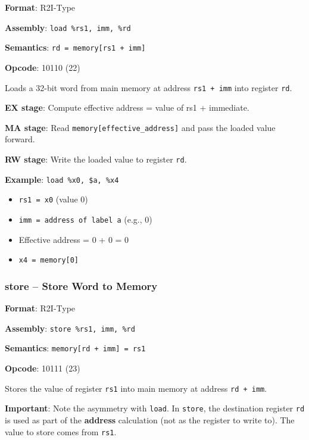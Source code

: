 \documentclass[12pt,a4paper]{article}
\begin{document}
\begin{tcolorbox}[colback=yellow!5, colframe=yellow!50!black]
\textbf{Format}: R2I-Type

\textbf{Assembly}: \texttt{load \%rs1, imm, \%rd}

\textbf{Semantics}: \texttt{rd = memory[rs1 + imm]}

\textbf{Opcode}: 10110 (22)
\end{tcolorbox}

Loads a 32-bit word from main memory at address \texttt{rs1 + imm} into register \texttt{rd}.

\textbf{EX stage}: Compute effective address = value of rs1 + immediate.

\textbf{MA stage}: Read \texttt{memory[effective\_address]} and pass the loaded value forward.

\textbf{RW stage}: Write the loaded value to register \texttt{rd}.

\textbf{Example}: \texttt{load \%x0, \$a, \%x4}
\begin{itemize}
    \item \texttt{rs1 = x0} (value 0)
    \item \texttt{imm = address of label a} (e.g., 0)
    \item Effective address = 0 + 0 = 0
    \item \texttt{x4 = memory[0]}
\end{itemize}

\subsubsection{store -- Store Word to Memory}

\begin{tcolorbox}[colback=yellow!5, colframe=yellow!50!black]
\textbf{Format}: R2I-Type

\textbf{Assembly}: \texttt{store \%rs1, imm, \%rd}

\textbf{Semantics}: \texttt{memory[rd + imm] = rs1}

\textbf{Opcode}: 10111 (23)
\end{tcolorbox}

Stores the value of register \texttt{rs1} into main memory at address \texttt{rd + imm}.

\textbf{Important}: Note the asymmetry with \texttt{load}. In \texttt{store}, the destination register \texttt{rd} is used as part of the \textbf{address} calculation (not as the register to write to). The value to store comes from \texttt{rs1}.
\end{document}
